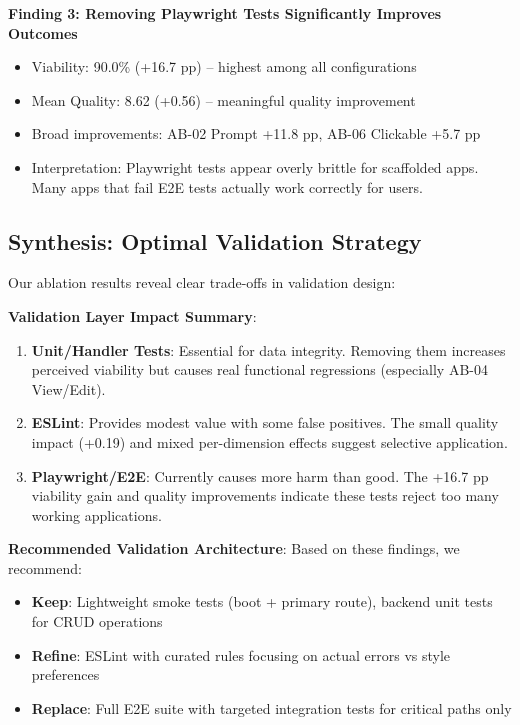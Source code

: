 \documentclass[conference]{IEEEtran}
\begin{document}
\textbf{Finding 3: Removing Playwright Tests Significantly Improves Outcomes}
\begin{itemize}
\item Viability: 90.0\% (+16.7 pp) -- highest among all configurations
\item Mean Quality: 8.62 (+0.56) -- meaningful quality improvement
\item Broad improvements: AB-02 Prompt +11.8 pp, AB-06 Clickable +5.7 pp
\item Interpretation: Playwright tests appear overly brittle for scaffolded apps. Many apps that fail E2E tests actually work correctly for users.
\end{itemize}

\subsection{Synthesis: Optimal Validation Strategy}

Our ablation results reveal clear trade-offs in validation design:

\textbf{Validation Layer Impact Summary}:
\begin{enumerate}
\item \textbf{Unit/Handler Tests}: Essential for data integrity. Removing them increases perceived viability but causes real functional regressions (especially AB-04 View/Edit).
\item \textbf{ESLint}: Provides modest value with some false positives. The small quality impact (+0.19) and mixed per-dimension effects suggest selective application.
\item \textbf{Playwright/E2E}: Currently causes more harm than good. The +16.7 pp viability gain and quality improvements indicate these tests reject too many working applications.
\end{enumerate}

\textbf{Recommended Validation Architecture}:
Based on these findings, we recommend:
\begin{itemize}
\item \textbf{Keep}: Lightweight smoke tests (boot + primary route), backend unit tests for CRUD operations
\item \textbf{Refine}: ESLint with curated rules focusing on actual errors vs style preferences
\item \textbf{Replace}: Full E2E suite with targeted integration tests for critical paths only
\end{itemize}
\end{document}
